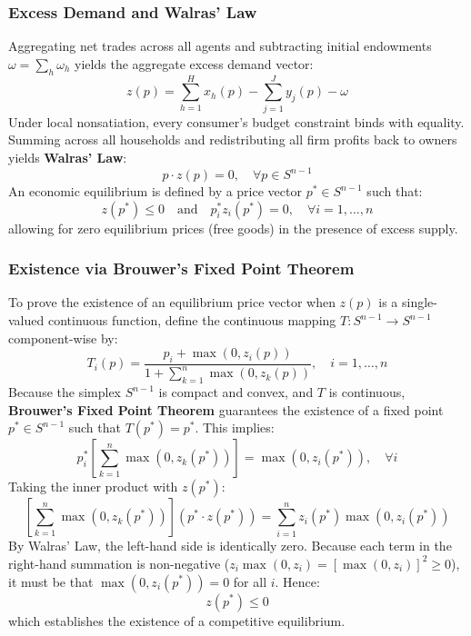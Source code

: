 \documentclass[11pt,a4paper]{article}
\begin{document}
\subsubsection{Excess Demand and Walras' Law}
Aggregating net trades across all agents and subtracting initial endowments $\omega = \sum_h \omega_h$ yields the aggregate excess demand vector:
\begin{equation}
z(p) = \sum_{h=1}^H x_h(p) - \sum_{j=1}^J y_j(p) - \omega
\end{equation}
Under local nonsatiation, every consumer's budget constraint binds with equality. Summing across all households and redistributing all firm profits back to owners yields \textbf{Walras' Law}:
\begin{equation}
p \cdot z(p) = 0, \quad \forall p \in S^{n-1}
\end{equation}
An economic equilibrium is defined by a price vector $p^* \in S^{n-1}$ such that:
\begin{equation}
z(p^*) \le 0 \quad \text{and} \quad p_i^* z_i(p^*) = 0, \quad \forall i = 1, \dots, n
\end{equation}
allowing for zero equilibrium prices (free goods) in the presence of excess supply.

\subsubsection{Existence via Brouwer's Fixed Point Theorem}
To prove the existence of an equilibrium price vector when $z(p)$ is a single-valued continuous function, define the continuous mapping $T: S^{n-1} \to S^{n-1}$ component-wise by:
\begin{equation}
T_i(p) = \frac{p_i + \max\left(0, z_i(p)\right)}{1 + \sum_{k=1}^n \max\left(0, z_k(p)\right)}, \quad i = 1, \dots, n
\end{equation}
Because the simplex $S^{n-1}$ is compact and convex, and $T$ is continuous, \textbf{Brouwer's Fixed Point Theorem} guarantees the existence of a fixed point $p^* \in S^{n-1}$ such that $T(p^*) = p^*$. This implies:
\begin{equation}
p_i^* \left[ \sum_{k=1}^n \max\left(0, z_k(p^*)\right) \right] = \max\left(0, z_i(p^*)\right), \quad \forall i
\end{equation}
Taking the inner product with $z(p^*)$:
\begin{equation}
\left[ \sum_{k=1}^n \max\left(0, z_k(p^*)\right) \right] \left( p^* \cdot z(p^*) \right) = \sum_{i=1}^n z_i(p^*) \max\left(0, z_i(p^*)\right)
\end{equation}
By Walras' Law, the left-hand side is identically zero. Because each term in the right-hand summation is non-negative ($z_i \max(0, z_i) = [\max(0, z_i)]^2 \ge 0$), it must be that $\max(0, z_i(p^*)) = 0$ for all $i$. Hence:
\begin{equation}
z(p^*) \le 0
\end{equation}
which establishes the existence of a competitive equilibrium.
\end{document}
